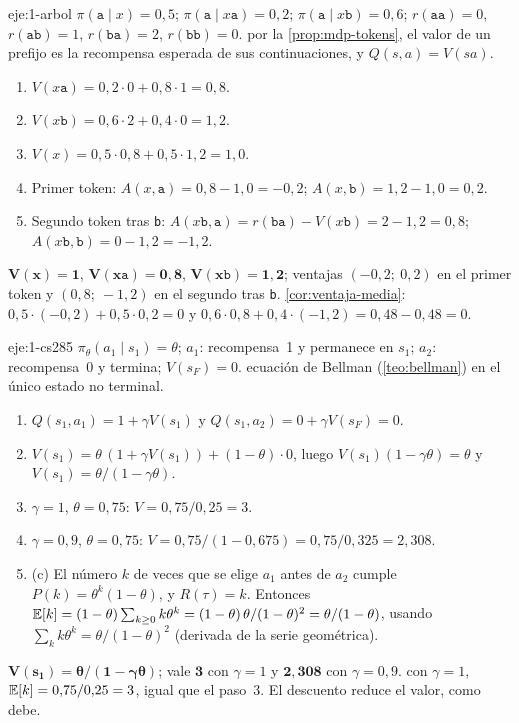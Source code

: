 \begin{solucion}{eje:1-arbol}
\datos $\pi(\texttt{a}\mid x)=0{,}5$; $\pi(\texttt{a}\mid x\texttt{a})=0{,}2$; $\pi(\texttt{a}\mid x\texttt{b})=0{,}6$; $r(\texttt{aa})=0$, $r(\texttt{ab})=1$, $r(\texttt{ba})=2$, $r(\texttt{bb})=0$.
\planteamiento por la \cref{prop:mdp-tokens}, el valor de un prefijo es la recompensa esperada de sus continuaciones, y $Q(s,a)=V(sa)$.
\pasos
\begin{enumerate}[label=\arabic*.]
  \item $V(x\texttt{a})=0{,}2\cdot 0+0{,}8\cdot 1=0{,}8$.
  \item $V(x\texttt{b})=0{,}6\cdot 2+0{,}4\cdot 0=1{,}2$.
  \item $V(x)=0{,}5\cdot 0{,}8+0{,}5\cdot 1{,}2=1{,}0$.
  \item Primer token: $A(x,\texttt{a})=0{,}8-1{,}0=-0{,}2$; $A(x,\texttt{b})=1{,}2-1{,}0=0{,}2$.
  \item Segundo token tras \texttt{b}: $A(x\texttt{b},\texttt{a})=r(\texttt{ba})-V(x\texttt{b})=2-1{,}2=0{,}8$; $A(x\texttt{b},\texttt{b})=0-1{,}2=-1{,}2$.
\end{enumerate}
\resultado $\mathbf{V(x)=1}$, $\mathbf{V(x\texttt{a})=0{,}8}$, $\mathbf{V(x\texttt{b})=1{,}2}$; ventajas $(-0{,}2;\ 0{,}2)$ en el primer token y $(0{,}8;\ -1{,}2)$ en el segundo tras \texttt{b}.
\comprobacion \cref{cor:ventaja-media}: $0{,}5\cdot(-0{,}2)+0{,}5\cdot 0{,}2=0$ y $0{,}6\cdot 0{,}8+0{,}4\cdot(-1{,}2)=0{,}48-0{,}48=0$.
\end{solucion}

\begin{solucion}{eje:1-cs285}
\datos $\pi_\theta(a_1\mid s_1)=\theta$; $a_1$: recompensa~1 y permanece en $s_1$; $a_2$: recompensa~0 y termina; $V(s_F)=0$.
\planteamiento ecuación de Bellman (\cref{teo:bellman}) en el único estado no terminal.
\pasos
\begin{enumerate}[label=\arabic*.]
  \item $Q(s_1,a_1)=1+\gamma V(s_1)$ y $Q(s_1,a_2)=0+\gamma V(s_F)=0$.
  \item $V(s_1)=\theta\,(1+\gamma V(s_1))+(1-\theta)\cdot 0$, luego $V(s_1)(1-\gamma\theta)=\theta$ y $V(s_1)=\theta/(1-\gamma\theta)$.
  \item $\gamma=1$, $\theta=0{,}75$: $V=0{,}75/0{,}25=3$.
  \item $\gamma=0{,}9$, $\theta=0{,}75$: $V=0{,}75/(1-0{,}675)=0{,}75/0{,}325=2{,}308$.
  \item (c) El número $k$ de veces que se elige $a_1$ antes de $a_2$ cumple $P(k)=\theta^{k}(1-\theta)$, y $R(\tau)=k$. Entonces $\mathbb{E}[k]=(1-\theta)\sum_{k\ge0}k\theta^{k}=(1-\theta)\,\theta/(1-\theta)^{2}=\theta/(1-\theta)$, usando $\sum_k k\theta^{k}=\theta/(1-\theta)^{2}$ (derivada de la serie geométrica).
\end{enumerate}
\resultado $\mathbf{V(s_1)=\theta/(1-\gamma\theta)}$; vale $\mathbf{3}$ con $\gamma=1$ y $\mathbf{2{,}308}$ con $\gamma=0{,}9$.
\comprobacion con $\gamma=1$, $\mathbb{E}[k]=0{,}75/0{,}25=3$, igual que el paso~3. El descuento reduce el valor, como debe.
\end{solucion}

